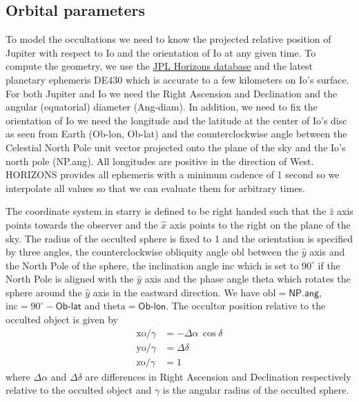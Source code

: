 \documentclass[modern]{aastex62}
\begin{document}
\subsection{Orbital parameters}
\label{ssec:orbital_parameters}
To model the occultations we need to know the projected relative position of Jupiter with respect to Io and the orientation of Io at any given time.
To compute the geometry, we use the \href{https://ssd.jpl.nasa.gov/horizons.cgi}{JPL Horizons database} and the latest planetary ephemeris DE430 \citep{folkner2014} which is accurate to a few kilometers on Io's surface.
For both Jupiter and Io we need the Right Ascension and Declination and the angular (equatorial) diameter (\textsf{Ang-diam}).
In addition, we need to fix the orientation of Io we need the longitude and the latitude at the center of Io's disc as seen from Earth (\textsf{Ob-lon}, \textsf{Ob-lat}) and the counterclockwise angle between the Celestial North Pole unit vector projected onto the plane of the sky and the Io's north pole (\textsf{NP.ang}).
All longitudes are positive  in the direction of West.
\textsf{HORIZONS} provides all ephemeris with a minimum cadence of 1 second so we interpolate all values so that we can evaluate them for arbitrary times.

The coordinate system in \textsf{starry} is defined to be right handed such that the $\hat{z}$
axis points towards the observer and the $\hat{x}$ axis points to the right on the plane of the sky.
The radius of the occulted sphere is fixed to 1 and the orientation is specified by three angles,
the counterclockwise obliquity angle \textsf{obl} between the $\hat{y}$ axis and the North Pole of the sphere, the inclination angle \textsf{inc} which is set to $90^\circ$ if the North Pole is aligned with the $\hat{y}$ axis and the phase angle \textsf{theta} which rotates the sphere around the $\hat{y}$ axis in the eastward direction.
We have $\mathrm{obl}=\textsf{NP.ang}$, $\mathrm{inc}=90^\circ-\textsf{Ob-lat}$ and
$\mathrm{theta}=\textsf{Ob-lon}$.
The occultor position relative to the occulted object is given by
\begin{align}
    \mathrm{xo}/\gamma&=-\Delta\alpha\,\cos\delta\\
    \mathrm{yo}/\gamma&=\Delta\delta\\
    \mathrm{zo}/\gamma&=1
\end{align}
where $\Delta\alpha$ and $\Delta\delta$ are differences in Right Ascension and Declination respectively relative to the occulted object and $\gamma$ is the angular radius of the occulted sphere.
\end{document}
